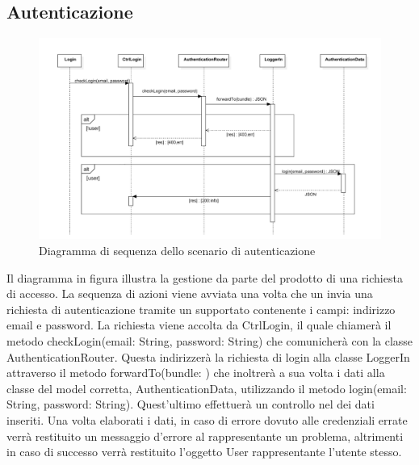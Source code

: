 \documentclass[a4paper, titlepage]{article}
\begin{document}
\subsection{Autenticazione}
\begin{figure}[!h]
	\centering
	\includegraphics[scale=0.5]{Img/seq-login.pdf}
	\caption{Diagramma di sequenza dello scenario di autenticazione}
\end{figure}
Il diagramma in figura illustra la gestione da parte del prodotto di una richiesta di accesso. La sequenza di azioni viene avviata una volta che un  invia una richiesta di autenticazione tramite un   supportato contenente i campi: indirizzo email e password.
La richiesta viene accolta da CtrlLogin, il quale chiamerà il metodo checkLogin(email: String, password: String) che comunicherà con la classe AuthenticationRouter. Questa indirizzerà la richiesta di login alla classe LoggerIn attraverso il metodo forwardTo(bundle: ) che inoltrerà a sua volta i dati alla classe del model corretta, AuthenticationData, utilizzando il metodo login(email: String, password: String). Quest'ultimo effettuerà un controllo nel  dei dati inseriti. Una volta elaborati i dati, in caso di errore dovuto alle credenziali errate verrà restituito un messaggio d'errore al  rappresentante un problema, altrimenti in caso di successo verrà restituito l'oggetto User rappresentante l'utente stesso.

\newpage
\end{document}
